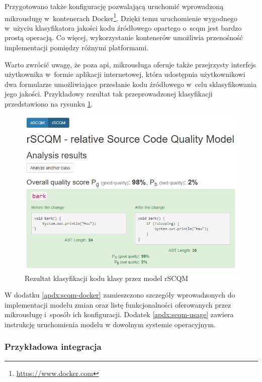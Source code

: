 \documentclass[twoside]{praca}
\begin{document}
Przygotowano także konfigurację pozwalającą uruchomić wprowadzoną mikrousługę w~kontenerach Docker\footnote{\url{https://www.docker.com}}. Dzięki temu uruchomienie wygodnego w~użyciu klasyfikatora jakości kodu źródłowego opartego o~\gls{scqm} jest bardzo prostą operacją. Co więcej, wykorzystanie kontenerów umożliwia przenośność implementacji pomiędzy różnymi platformami.

Warto zwrócić uwagę, że poza \gls{api}, mikrousługa oferuje także przejrzysty interfejs użytkownika w~formie aplikacji internetowej, która udostępnia użytkownikowi dwa formularze umożliwiające przesłanie kodu źródłowego w~celu sklasyfikowania jego jakości. Przykładowy rezultat tak przeprowadzonej klasyfikacji przedstawiono na rysunku \ref{fig:eval:rscqm-result-here}.

\begin{figure}[H]
\centering
\includegraphics[width=\textwidth]{eval/rscqm-result.png}
\caption{Rezultat klasyfikacji kodu klasy przez model rSCQM}
\label{fig:eval:rscqm-result-here}
\end{figure}

W dodatku \ref{apdx:scqm-docker} zamieszczono szczegóły wprowadzonych do implementacji modelu zmian oraz listę funkcjonalności oferowanych przez mikrousługę i~sposób ich konfiguracji. Dodatek \ref{apdx:scqm-usage} zawiera instrukcję uruchomienia modelu w dowolnym systemie operacyjnym.


\subsubsection{Przykładowa integracja}
\end{document}
